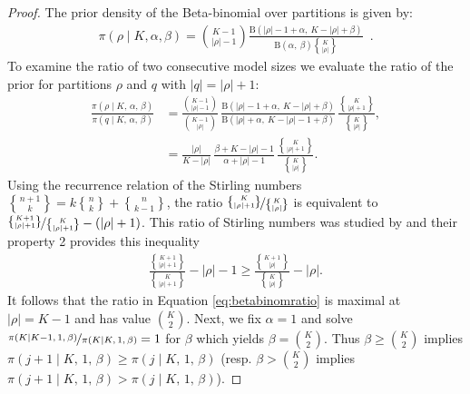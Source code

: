 \documentclass[11pt,a4paper]{article}
\theoremstyle{definition} %
\theoremstyle{case}
\newcommand{\FBeta}[2]{\text{B}\left({#1},\ {#2}\right)}
\DeclareRobustCommand{\stirling}{\genfrac\{\}{0pt}{}}
\begin{document}
\begin{proof}
The prior density of the Beta-binomial over partitions is given by:
\begin{align*}
    \pi\left(\rho \mid K, \alpha, \beta\right) = \binom{K - 1}{|\rho| - 1}
    \frac{\FBeta{|\rho| - 1 + \alpha}{K - |\rho| + \beta}}
    {\FBeta{\alpha}{\beta}\stirling{K}{|\rho|}} \enspace .
\end{align*}
To examine the ratio of two consecutive model sizes we evaluate the ratio of the prior for partitions $\rho$ and $q$ with $|q| = |\rho|+1$:
\begin{align}\label{eq:betabinomratio}
    \frac{
        \pi\left(\rho \mid K,\,\alpha,\,\beta\right)
    }{
        \pi\left(q \mid K,\,\alpha,\,\beta\right)
    }
    &=
    \frac{\binom{K - 1}{|\rho| - 1}}{\binom{K - 1}{|\rho|}}
    \,
    \frac{
        \FBeta{|\rho| - 1 + \alpha}{K - |\rho| + \beta}
    }{
        \FBeta{|\rho| + \alpha}{K - |\rho| - 1 + \beta}
    }
    \,
    \frac{\stirling{K}{|\rho|+1}}{\stirling{K}{|\rho|}},
    \\
    &=
    \frac{|\rho|}{K - |\rho|}
    \,
    \frac{\beta +K-|\rho| -1}{\alpha +|\rho| -1}
    \,
    \frac{\stirling{K}{|\rho|+1}}{\stirling{K}{|\rho|}}.
\end{align}
Using the recurrence relation of the Stirling numbers $\stirling{n+1}{k} = k\stirling{n}{k} + \stirling{n}{k-1}$, the ratio $\nicefrac{\stirling{K}{|\rho|+1}}{\stirling{K}{|\rho|}}$ is equivalent to $\nicefrac{\stirling{K+1}{|\rho|+1}}{\stirling{K}{|\rho|+1}} - (|\rho|+1)$.
This ratio of Stirling numbers was studied by \textcite{berg1975some} and their property 2 provides this inequality
\begin{align*}
    \frac{\stirling{K+1}{|\rho|+1}}{\stirling{K}{|\rho|+1}} - |\rho| - 1
    \geq
    \frac{\stirling{K+1}{|\rho|}}{\stirling{K}{|\rho|}} - |\rho|.
\end{align*}
It follows that the ratio in Equation \eqref{eq:betabinomratio} is maximal at $|\rho| = K-1$ and has value $\binom{K}{2}$.
Next, we fix $\alpha=1$ and solve $\nicefrac{
        \pi\left(K \mid K-1,\,1,\,\beta\right)
    }{
        \pi\left(K \mid K,\,1,\,\beta\right)
    } = 1$ for $\beta$ which yields $\beta = \binom{K}{2}$.
Thus $\beta\geq \binom{K}{2}$ implies $\pi\left(j+1 \mid K,\,1,\,\beta\right)\geq\pi\left(j \mid K,\,1,\,\beta\right)$ (resp. $\beta > \binom{K}{2}$ implies $\pi\left(j+1 \mid K,\,1,\,\beta\right) > \pi\left(j \mid K,\,1,\,\beta\right)$).
\end{proof}
\end{document}
